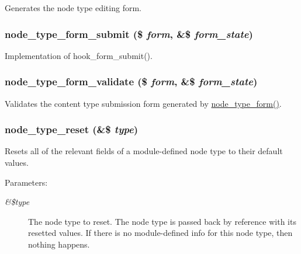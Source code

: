 Generates the node type editing form. \hypertarget{content__types_8inc_fa55f7240b05f2a2804c11766228a5af}{
\subsubsection[{node\_\-type\_\-form\_\-submit}]{\setlength{\rightskip}{0pt plus 5cm}node\_\-type\_\-form\_\-submit (\$ {\em form}, \/  \&\$ {\em form\_\-state})}}
\label{content__types_8inc_fa55f7240b05f2a2804c11766228a5af}


Implementation of hook\_\-form\_\-submit(). \hypertarget{content__types_8inc_9bce2bd1a17217d5573cdc8b4465c1f9}{
\subsubsection[{node\_\-type\_\-form\_\-validate}]{\setlength{\rightskip}{0pt plus 5cm}node\_\-type\_\-form\_\-validate (\$ {\em form}, \/  \&\$ {\em form\_\-state})}}
\label{content__types_8inc_9bce2bd1a17217d5573cdc8b4465c1f9}


Validates the content type submission form generated by \hyperlink{content__types_8inc_29b6f02d1269c1f1f0e8d6d0e18f9b96}{node\_\-type\_\-form()}. \hypertarget{content__types_8inc_cf80450120d7e77131b8a42c857bfb8a}{
\subsubsection[{node\_\-type\_\-reset}]{\setlength{\rightskip}{0pt plus 5cm}node\_\-type\_\-reset (\&\$ {\em type})}}
\label{content__types_8inc_cf80450120d7e77131b8a42c857bfb8a}


Resets all of the relevant fields of a module-defined node type to their default values.

\begin{Desc}
\item[Parameters:]
\begin{description}
\item[{\em \&\$type}]The node type to reset. The node type is passed back by reference with its resetted values. If there is no module-defined info for this node type, then nothing happens. \end{description}
\end{Desc}
